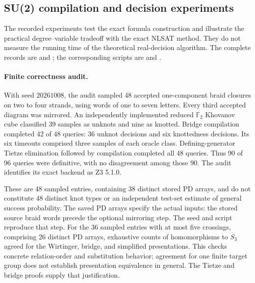 
\subsection{SU(2) compilation and decision experiments}
\label{subsec:su2-experiments}

The recorded experiments test the exact formula construction and illustrate
the practical degree--variable tradeoff with the exact NLSAT method\cite{JovanovicDeMoura2012,ProgrammingZ3}.  They do not measure the running
time of the theoretical real-decision algorithm.  The complete records are
 and
; the corresponding scripts are
 and
.

\paragraph{Finite correctness audit.}
With seed $20261008$, the audit sampled 48 accepted one-component braid
closures on two to four strands, using words of one to seven letters.
Every third accepted diagram was mirrored.  An independently implemented
reduced $\mathbb F_2$ Khovanov cube classified 39 samples as unknots
and nine as knotted.  Bridge compilation completed 42 of 48 queries:
36 unknot decisions and six knottedness decisions.  Its six timeouts
comprised three samples of each oracle class.  Defining-generator Tietze
elimination followed by compilation completed all 48 queries.  Thus 90 of
96 queries were definitive, with no disagreement among those 90.
The audit identifies its exact backend as Z3 5.1.0.

These are 48 sampled entries, containing 38 distinct stored PD arrays,
and do not constitute 48 distinct knot types or an independent test-set
estimate of general success probability.  The saved PD arrays specify
the actual inputs: the stored source braid words precede the optional
mirroring step.  The seed and script reproduce that step.
For the 36 sampled entries with at most five crossings, comprising 26
distinct PD arrays, exhaustive counts of homomorphisms to $S_3$ agreed
for the Wirtinger, bridge, and simplified presentations.  This checks
concrete relation-order and substitution behavior; agreement for one
finite target group does not establish presentation equivalence in
general.  The Tietze and bridge proofs supply that justification.

